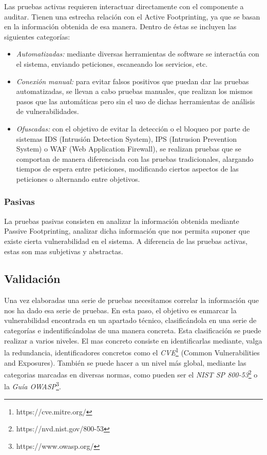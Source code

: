 Las pruebas activas requieren interactuar directamente con el componente a auditar. Tienen una estrecha relación con el Active Footprinting, ya que se basan en la información obtenida de esa manera. Dentro de éstas se incluyen las siguientes categorías:

\begin{itemize}
	\item \emph{Automatizadas:} mediante diversas herramientas de software se interactúa con el sistema, enviando peticiones, escaneando los servicios, etc.
	\item \emph{Conexión manual:} para evitar falsos positivos que puedan dar las pruebas automatizadas, se llevan a cabo pruebas manuales, que realizan los mismos pasos que las automáticas pero sin el uso de dichas herramientas de análisis de vulnerabilidades.
	\item \emph{Ofuscadas:} con el objetivo de evitar la detección o el bloqueo por parte de sistemas IDS (Intrusión Detection System), IPS (Intrusion Prevention System) o WAF (Web Application Firewall), se realizan pruebas que se comportan de manera diferenciada con las pruebas tradicionales, alargando tiempos de espera entre peticiones, modificando ciertos aspectos de las peticiones o alternando entre objetivos.
\end{itemize}

\subsubsection{Pasivas}

La pruebas pasivas consisten en analizar la información obtenida mediante Passive Footprinting, analizar dicha información que nos permita suponer que existe cierta vulnerabilidad en el sistema. A diferencia de las pruebas activas, estas son mas subjetivas y abstractas.

\subsection{Validación}

Una vez elaboradas una serie de pruebas necesitamos correlar la información que nos ha dado esa serie de pruebas. En esta paso, el objetivo es enmarcar la vulnerabilidad encontrada en un apartado técnico, clasificándola en una serie de categorías e indentificándolas de una manera concreta. Esta clasificación se puede realizar a varios niveles.
El mas concreto consiste en identificarlas mediante, valga la redundancia, identificadores concretos como el \emph{CVE}\footnote{https://cve.mitre.org/} (Common Vulnerabilities and Exposures). También se puede hacer a un nivel más global, mediante las categorias marcadas en diversas normas, como pueden ser el \emph{NIST SP 800-53}\footnote{https://nvd.nist.gov/800-53} o la \textit{Guía OWASP}\footnote{https://www.owasp.org/}.
	
